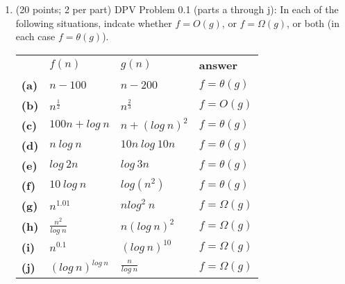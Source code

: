 \documentclass{article}
\begin{document}
    \begin{enumerate}[label=\textbf{Q1}]
        \item (20 points; 2 per part) DPV Problem 0.1 (parts a through j): In each of the following situations, indcate whether $f = O(g)$, or $f = \Omega(g)$, or both (in each case $f = \theta(g)$).\\[0.25in]
        \begin{tabular}{l l l l}
            &$f(n)$ & $g(n)$ & \textbf{answer}\\
            \textbf{(a)} & $n - 100$ & $n - 200$ & $f = \theta(g)$\\
            \textbf{(b)} & $n^{\frac{1}{2}}$ & $n^{\frac{2}{3}}$ & $f = O(g)$\\
            \textbf{(c)} & $100n + log\ n$ & $n + (log\ n)^2$ & $f = \theta(g)$\\
            \textbf{(d)} & $n\ log\ n$ & $10n\ log\ 10n$ & $f = \theta(g)$\\
            \textbf{(e)} & $log\ 2n$ & $log\ 3n$ & $f = \theta(g)$\\
            \textbf{(f)} & $10\ log\ n$ & $log(n^2)$ & $f = \theta(g)$\\
            \textbf{(g)} & $n^{1.01}$ & $nlog^2\ n$ & $f = \Omega(g)$\\
            \textbf{(h)} & $\frac{n^2}{log\ n}$ & $n(log\ n)^2$ & $f = \Omega(g)$\\
            \textbf{(i)} & $n^{0.1}$ & $(log\ n)^{10}$ & $f = \Omega(g)$\\
            \textbf{(j)} & $(log\ n)^{log\ n}$ & $\frac{n}{log\ n}$ & $f = \Omega(g)$\\
        \end{tabular}
    \end{enumerate}
\end{document}

